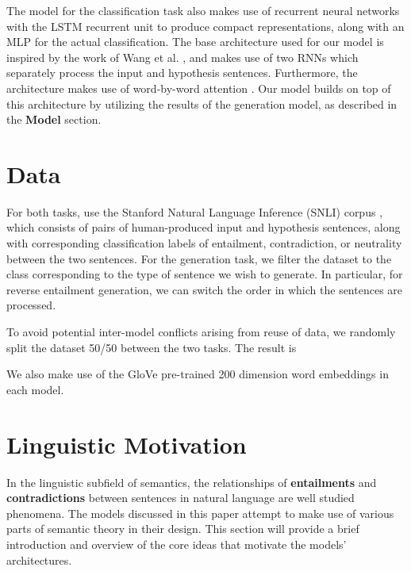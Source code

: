 \documentclass[a4paper, 12pt]{article}
\theoremstyle{definition}
\begin{document}
\bigskip

The model for the classification task also makes use of recurrent neural networks with the LSTM \cite{lstm-schmid} recurrent unit to produce compact representations, along with an MLP for the actual classification. The base architecture used for our model is inspired by the work of Wang et al. \cite{wang-nli}, and makes use of two RNNs which separately process the input and hypothesis sentences. Furthermore, the architecture makes use of word-by-word attention \cite{attention-rockt}. Our model builds on top of this architecture by utilizing the results of the generation model, as described in the \textbf{Model} section.

\section{Data}

For both tasks, use the Stanford Natural Language Inference (SNLI) corpus \cite{snli-stanford}, which consists of pairs of human-produced input and hypothesis sentences, along with corresponding classification labels of entailment, contradiction, or neutrality between the two sentences. For the generation task, we filter the dataset to the class corresponding to the type of sentence we wish to generate. In particular, for reverse entailment generation, we can switch the order in which the sentences are processed.

\bigskip

To avoid potential inter-model conflicts arising from reuse of data, we randomly split the dataset 50/50 between the two tasks. The result is 

\bigskip

We also make use of the GloVe \cite{glove} pre-trained 200 dimension word embeddings in each model.

\section{Linguistic Motivation}

In the linguistic subfield of semantics, the relationships of \textbf{entailments} and \textbf{contradictions} between sentences in natural language are well studied phenomena. The models discussed in this paper attempt to make use of various parts of semantic theory in their design. This section will provide a brief introduction and overview of the core ideas that motivate the models' architectures.

\bigskip
\end{document}
